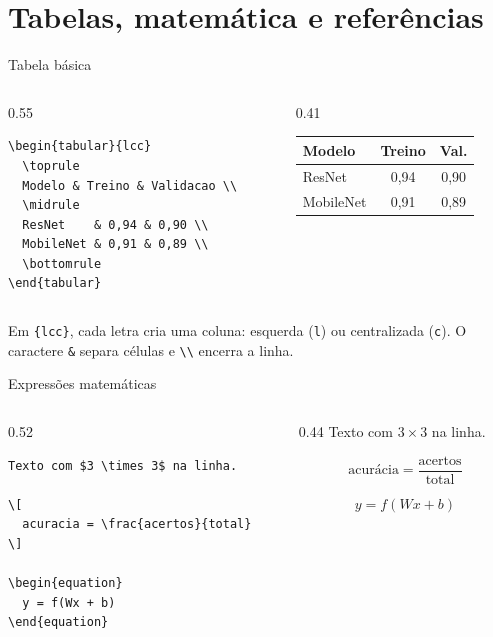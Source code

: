 \section{Tabelas, matemática e referências}

\begin{frame}[fragile]{Tabela básica}
\begin{columns}[T]
\begin{column}{0.55\textwidth}
\begin{lstlisting}
\begin{tabular}{lcc}
  \toprule
  Modelo & Treino & Validacao \\
  \midrule
  ResNet    & 0,94 & 0,90 \\
  MobileNet & 0,91 & 0,89 \\
  \bottomrule
\end{tabular}
\end{lstlisting}
\end{column}
\begin{column}{0.41\textwidth}
\centering
\begin{tabular}{lcc}
  \toprule
  Modelo & Treino & Val. \\
  \midrule
  ResNet & 0,94 & 0,90 \\
  MobileNet & 0,91 & 0,89 \\
  \bottomrule
\end{tabular}
\end{column}
\end{columns}

Em \verb|{lcc}|, cada letra cria uma coluna: esquerda (\texttt{l}) ou centralizada (\texttt{c}). O caractere \verb|&| separa células e \verb|\\| encerra a linha.
\end{frame}

\begin{frame}[fragile]{Expressões matemáticas}
\begin{columns}[T]
\begin{column}{0.52\textwidth}
\begin{lstlisting}
Texto com $3 \times 3$ na linha.

\[
  acuracia = \frac{acertos}{total}
\]

\begin{equation}
  y = f(Wx + b)
\end{equation}
\end{lstlisting}
\end{column}
\begin{column}{0.44\textwidth}
Texto com $3 \times 3$ na linha.

\[
  \text{acurácia} = \frac{\mathrm{acertos}}{\mathrm{total}}
\]

\begin{equation}
  y = f(Wx + b)
\end{equation}
\end{column}
\end{columns}
\end{frame}

